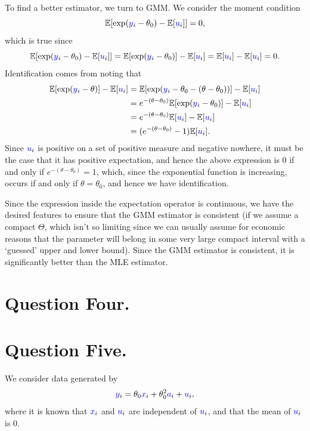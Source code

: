 \documentclass{article}
\renewcommand{\r}[1]{\textcolor{blue}{#1}}
\newcommand{\E}{\mathbb{E}}
\begin{document}
To find a better estimator, we turn to GMM. We consider the moment condition
\begin{equation} \E[\exp(\r{y}_{i}-\theta_{0})-\E[\r{u}_{i}]]=0,\end{equation}
which is true since
\begin{equation} \E[\exp(\r{y}_{i}-\theta_{0})-\E[\r{u}_{i}]]=\E[\exp(\r{y}_{i}-\theta_{0})]-\E[\r{u}_{i}]=\E[\r{u}_{i}]-\E[\r{u}_{i}]=0.\end{equation}
Identification comes from noting that
\begin{equation}\begin{split} \E[\exp(\r{y}_{i}-\theta)]-\E[\r{u}_{i}]&=\E[\exp(\r{y}_{i}-\theta_{0}-(\theta-\theta_{0}))]-\E[\r{u}_{i}]\\
&=e^{-(\theta-\theta_{0})}\E[\exp(\r{y}_{i}-\theta_{0})]-\E[\r{u}_{i}]\\
&=e^{-(\theta-\theta_{0})}\E[\r{u}_{i}]-\E[\r{u}_{i}]\\
&=(e^{-(\theta-\theta_{0})}-1)\E[\r{u}_{i}].
\end{split}\end{equation}
Since $\r{u}_{i}$ is positive on a set of positive measure and negative nowhere, it must be the case that it has positive expectation, and hence the above expression is 0 if and only if $e^{-(\theta-\theta_{0})}=1$, which, since the exponential function is increasing, occurs if and only if $\theta=\theta_{0}$, and hence we have identification.

Since the expression inside the expectation operator is continuous, we have the desired features to ensure that the GMM estimator is consistent (if we assume a compact $\Theta$, which isn't so limiting since we can usually assume for economic reasons that the parameter will belong in some very large compact interval with a `guessed' upper and lower bound). Since the GMM estimator is consistent, it is significantly better than the MLE estimator. 






\section{Question Four.}


\section{Question Five.}
We consider data generated by 
\begin{equation} \r{y}_{i}=\theta_{0}\r{x}_{i}+\theta_{0}^{2}\r{a}_{i}+\r{u}_{i},\end{equation}
where it is known that $\r{x}_{i}$ and $\r{u}_{i}$ are independent of $\r{u}_{i}$, and that the mean of $\r{u}_{i}$ is 0. 
\end{document}
